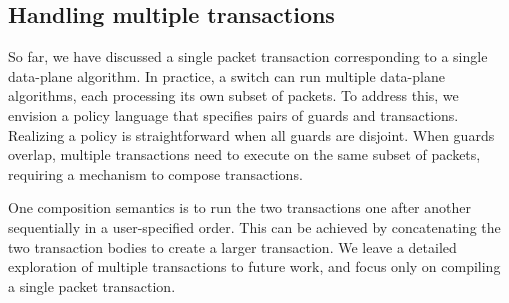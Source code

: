 

\subsection{Handling multiple transactions}
\label{ss:multiple}
So far, we have discussed a single packet transaction corresponding to a single
data-plane algorithm. In practice, a switch can run multiple data-plane
algorithms, each processing its own subset of packets. To address this, we
envision a policy language that specifies pairs of guards and transactions.
Realizing a policy is straightforward when all guards are disjoint. When guards
overlap, multiple transactions need to execute on the same subset of packets,
requiring a mechanism to compose transactions.

One composition semantics is to run the two transactions one after another
sequentially in a user-specified order. This can be achieved by concatenating
the two transaction bodies to create a larger transaction.  We leave a detailed
exploration of multiple transactions to future work, and focus only on
compiling a single packet transaction.

